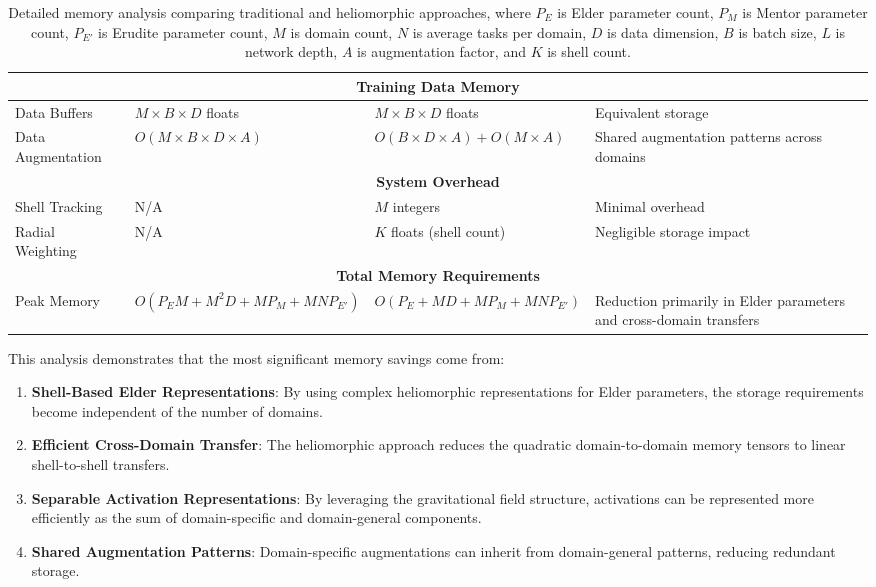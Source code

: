 \begin{table}[h]
\begin{tabular}{|p{3.5cm}|p{3.5cm}|p{3.5cm}|p{3.5cm}|}
\hline
\multicolumn{4}{|c|}{\textbf{Training Data Memory}} \\
\hline
Data Buffers & $M \times B \times D$ floats & $M \times B \times D$ floats & Equivalent storage \\
\hline
Data Augmentation & $O(M \times B \times D \times A)$ & $O(B \times D \times A) + O(M \times A)$ & Shared augmentation patterns across domains \\
\hline
\multicolumn{4}{|c|}{\textbf{System Overhead}} \\
\hline
Shell Tracking & N/A & $M$ integers & Minimal overhead \\
\hline
Radial Weighting & N/A & $K$ floats (shell count) & Negligible storage impact \\
\hline
\multicolumn{4}{|c|}{\textbf{Total Memory Requirements}} \\
\hline
Peak Memory & $O(P_E M + M^2 D + MP_M + MNP_{E'})$ & $O(P_E + MD + MP_M + MNP_{E'})$ & Reduction primarily in Elder parameters and cross-domain transfers \\
\hline
\end{tabular}
\caption{Detailed memory analysis comparing traditional and heliomorphic approaches, where $P_E$ is Elder parameter count, $P_M$ is Mentor parameter count, $P_{E'}$ is Erudite parameter count, $M$ is domain count, $N$ is average tasks per domain, $D$ is data dimension, $B$ is batch size, $L$ is network depth, $A$ is augmentation factor, and $K$ is shell count.}
\label{tab:memory_analysis}
\end{table}

This analysis demonstrates that the most significant memory savings come from:

\begin{enumerate}
    \item \textbf{Shell-Based Elder Representations}: By using complex heliomorphic representations for Elder parameters, the storage requirements become independent of the number of domains.
    
    \item \textbf{Efficient Cross-Domain Transfer}: The heliomorphic approach reduces the quadratic domain-to-domain memory tensors to linear shell-to-shell transfers.
    
    \item \textbf{Separable Activation Representations}: By leveraging the gravitational field structure, activations can be represented more efficiently as the sum of domain-specific and domain-general components.
    
    \item \textbf{Shared Augmentation Patterns}: Domain-specific augmentations can inherit from domain-general patterns, reducing redundant storage.
\end{enumerate}

